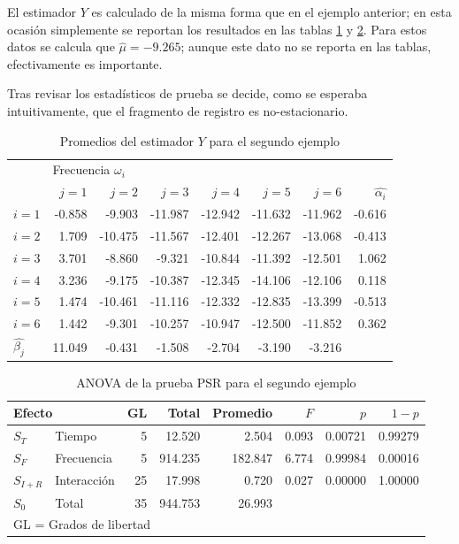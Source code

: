 \documentclass[12pt,letterpaper]{book}
\begin{document}
El estimador $Y$ es calculado de la misma forma que en el ejemplo anterior; en esta ocasión simplemente se reportan los resultados en las tablas \ref{tab:valores_psr_2} y \ref{tab:ejemplo_gl_2}.
%
Para estos datos se calcula que $\widehat{\mu} = -9.265$; aunque este dato no se reporta en las tablas, efectivamente es importante. 

Tras revisar los estadísticos de prueba se decide, como se esperaba intuitivamente, que el fragmento de registro es no-estacionario.

\begin{table}
\label{tab:valores_psr_2}
\caption{Promedios del estimador $Y$ para el segundo ejemplo}
\centering
\begin{tabular}{lrrrrrrr}
\toprule
      & \multicolumn{6}{l}{Frecuencia $\omega_i$} \\
\cmidrule{2-7}
      & $j=1$  & $j=2$   & $j=3$   & $j=4$   & $j=5$   & $j=6$   & $\widehat{\alpha_i}$ \\ 
\midrule
$i=1$ & -0.858 & -9.903  & -11.987 & -12.942 & -11.632 & -11.962 & -0.616 \\
$i=2$ & 1.709  & -10.475 & -11.567 & -12.401 & -12.267 & -13.068 & -0.413 \\
$i=3$ & 3.701  & -8.860  & -9.321  & -10.844 & -11.392 & -12.501 & 1.062  \\
$i=4$ & 3.236  & -9.175  & -10.387 & -12.345 & -14.106 & -12.106 & 0.118  \\
$i=5$ & 1.474  & -10.461 & -11.116 & -12.332 & -12.835 & -13.399 & -0.513 \\
$i=6$ & 1.442  & -9.301  & -10.257 & -10.947 & -12.500 & -11.852 & 0.362  \\
$\widehat{\beta_j}$
     & 11.049 & -0.431  & -1.508  & -2.704  & -3.190  & -3.216  &         \\
\bottomrule
\end{tabular}
\end{table}

\begin{table}
\label{tab:ejemplo_gl_2}
\centering
\caption{ANOVA de la prueba PSR para el segundo ejemplo}
\begin{tabular}{llrrrrrr}
\toprule
\multicolumn{2}{l}{Efecto}
                        & GL & Total   & Promedio & $F$   & $p$     & $1-p$   \\
\midrule
$S_T$     & Tiempo      & 5  & 12.520  & 2.504   & 0.093 & 0.00721 & 0.99279 \\
$S_F$     & Frecuencia  & 5  & 914.235 & 182.847 & 6.774 & 0.99984 & 0.00016 \\
$S_{I+R}$ & Interacción & 25 & 17.998  & 0.720   & 0.027 & 0.00000 & 1.00000 \\
$S_0$     & Total       & 35 & 944.753 & 26.993  &       &         &         \\
\bottomrule
\multicolumn{5}{l}{GL = Grados de libertad}
\end{tabular}
\end{table}
\end{document}
